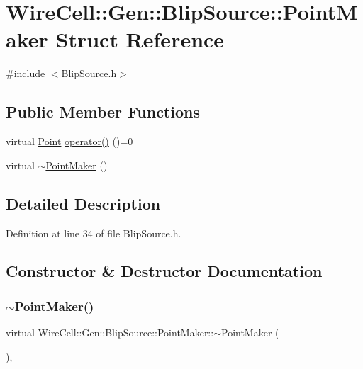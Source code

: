 \hypertarget{struct_wire_cell_1_1_gen_1_1_blip_source_1_1_point_maker}{}\section{Wire\+Cell\+:\+:Gen\+:\+:Blip\+Source\+:\+:Point\+Maker Struct Reference}
\label{struct_wire_cell_1_1_gen_1_1_blip_source_1_1_point_maker}


{\ttfamily \#include $<$Blip\+Source.\+h$>$}

\subsection*{Public Member Functions}
\begin{DoxyCompactItemize}
\item 
virtual \hyperlink{namespace_wire_cell_ab2b2565fa6432efbb4513c14c988cda9}{Point} \hyperlink{struct_wire_cell_1_1_gen_1_1_blip_source_1_1_point_maker_a582d2825f5dd2933583f7da351418c79}{operator()} ()=0
\item 
virtual \hyperlink{struct_wire_cell_1_1_gen_1_1_blip_source_1_1_point_maker_aa8fb8ad85822b1913dd5cf5026d95596}{$\sim$\+Point\+Maker} ()
\end{DoxyCompactItemize}


\subsection{Detailed Description}


Definition at line 34 of file Blip\+Source.\+h.



\subsection{Constructor \& Destructor Documentation}
\mbox{\label{struct_wire_cell_1_1_gen_1_1_blip_source_1_1_point_maker_aa8fb8ad85822b1913dd5cf5026d95596}} 
\subsubsection{\texorpdfstring{$\sim$\+Point\+Maker()}{~PointMaker()}}
{\footnotesize\ttfamily virtual Wire\+Cell\+::\+Gen\+::\+Blip\+Source\+::\+Point\+Maker\+::$\sim$\+Point\+Maker (\begin{DoxyParamCaption}{ }\end{DoxyParamCaption})\hspace{0.3cm}{\ttfamily [inline]}, {\ttfamily [virtual]}}



